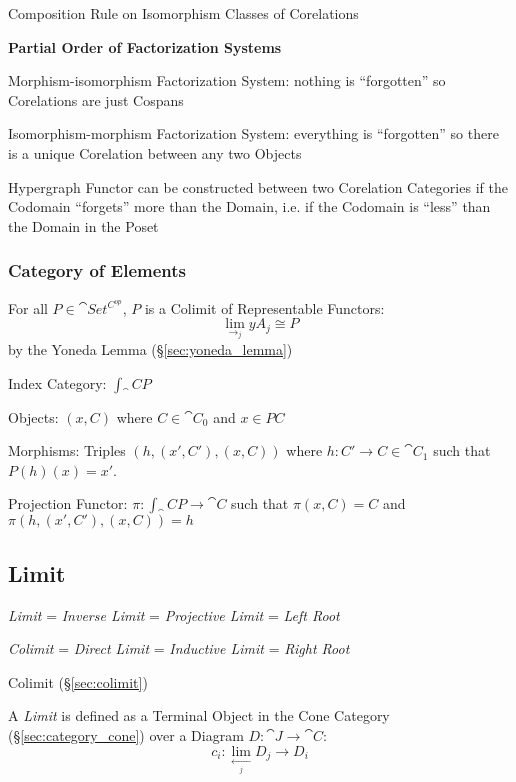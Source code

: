Composition Rule on Isomorphism Classes of Corelations %


\textbf{Partial Order of Factorization Systems} %

Morphism-isomorphism Factorization System: nothing is ``forgotten'' so
Corelations are just Cospans

Isomorphism-morphism Factorization System: everything is ``forgotten''
so there is a unique Corelation between any two Objects

Hypergraph Functor can be constructed between two Corelation
Categories if the Codomain ``forgets'' more than the Domain, i.e. if
the Codomain is ``less'' than the Domain in the Poset



\subsubsection{Category of Elements}\label{sec:element_category}

For all $P \in \cat{Set^{C^{op}}}$, $P$ is a Colimit of
Representable Functors:
\[
  \lim_{\rightarrow_j} yA_j \cong P
\]
by the Yoneda Lemma (\S\ref{sec:yoneda_lemma})

Index Category: $\int_\cat{C} P$

Objects: $(x,C)$ where $C \in \cat{C}_0$ and $x \in PC$

Morphisms: Triples $(h, (x',C'), (x,C))$ where $h : C' \rightarrow C
\in \cat{C}_1$ such that $P(h)(x) = x'$.

Projection Functor: $\pi : \int_\cat{C} P \rightarrow \cat{C}$
such that $\pi(x,C) = C$ and $\pi(h, (x',C'), (x,C)) = h$



\subsection{Limit}\label{sec:limit}

\emph{Limit} = \emph{Inverse Limit} = \emph{Projective Limit} =
\emph{Left Root}

\emph{Colimit} = \emph{Direct Limit} = \emph{Inductive Limit} =
\emph{Right Root}

Colimit (\S\ref{sec:colimit})

A \emph{Limit} is defined as a Terminal Object in the Cone Category
(\S\ref{sec:category_cone}) over a Diagram $D : \cat{J} \rightarrow
\cat{C}$:
\[
  c_i : \lim_{\xleftarrow[j]{}} D_j \rightarrow D_i
\]

